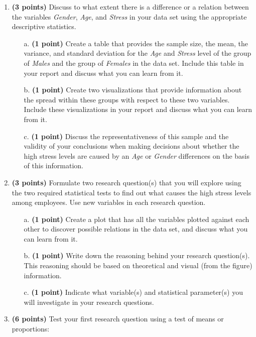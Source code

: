 {\begin{enumerate}
    \item \textbf{(3 points)} Discuss to what extent there is a difference or a relation between the variables \textit{Gender}, \textit{Age}, and \textit{Stress} in your data set using the appropriate descriptive statistics. 
    \begin{itemize}
        \item[a.] \textbf{(1 point)} Create a table that provides the sample size, the mean, the variance, and standard deviation for the \textit{Age} and \textit{Stress} level of the group of \textit{Males} and the group of \textit{Females} in the data set. Include this table in your report and discuss what you can learn from it. 
        \item[b.] \textbf{(1 point)} Create two visualizations that provide information about the spread within these groups with respect to these two variables. Include these visualizations in your report and discuss what you can learn from it.  
        \item[c.] \textbf{(1 point)} Discuss the representativeness of this sample and the validity of your conclusions when making decisions about whether the high stress levels are caused by an \textit{Age} or \textit{Gender} differences on the basis of this information.
    \end{itemize}
    \item \textbf{(3 points)} Formulate two research question(s) that you will explore using the two required statistical tests to find out what causes the high stress levels among employees. Use new variables in each research question.
    \begin{itemize}
        \item[a.] \textbf{(1 point)} Create a plot that has all the variables plotted against each other to discover possible relations in the data set, and discuss what you can learn from it.
        \item[b.] \textbf{(1 point)} Write down the reasoning behind your research question(s). This reasoning should be based on theoretical and visual (from the figure) information.
        \item[c.] \textbf{(1 point)} Indicate what variable(s) and statistical parameter(s) you will investigate in your research questions.
    \end{itemize}
    \item \textbf{(6 points)} Test your first research question using a test of means or proportions: 
    \begin{itemize}

\end{itemize}
\end{enumerate}}
